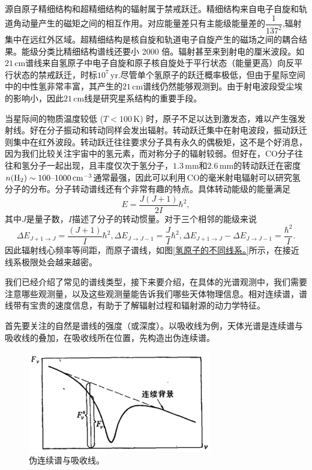 \documentclass[../天体物理基础.tex]{subfiles}
\begin{document}
源自原子精细结构和超精细结构的辐射属于禁戒跃迁。精细结构来自电子自旋和轨道角动量产生的磁矩之间的相互作用。对应能量差只有主能级能量差的$\dfrac{1}{137^{2}}$,辐射集中在远红外区域。超精细结构是核自旋和轨道电子自旋产生的磁场之间的耦合结果。能级分类比精细结构谱线还要小 2000 倍。辐射甚至来到射电的厘米波段。如$21\,\mathrm{cm}$谱线来自氢原子中电子自旋和原子核自旋处于平行状态（能量更高）向反平行状态的禁戒跃迁，时标$10^{7}\,\mathrm{yr}$.尽管单个氢原子的跃迁概率极低，但由于星际空间中的中性氢非常丰富，其产生的$21\,\mathrm{cm}$谱线仍然能够观测到。由于射电波段受尘埃的影响小，因此$21\,\mathrm{cm}$线是研究星系结构的重要手段。

当星际间的物质温度较低 ($T<100\,\mathrm{K}$) 时，原子不足以达到激发态，难以产生强发射线。好在分子振动和转动同样会发出辐射。转动跃迁集中在射电波段，振动跃迁则集中在红外波段。转动跃迁往往要求分子具有永久的偶极矩，这不是个好消息，因为我们比较关注宇宙中的氢元素，而对称分子的辐射较弱。但好在，$\mathrm{CO}$分子往往和氢分子一起出现，且丰度仅次于氢分子，$1.3\,\mathrm{mm}$和$2.6\,\mathrm{mm}$的转动跃迁在密度$n(\mathrm{H}_{2})\sim100\text{\textendash}1000\,\mathrm{cm^{-3}}$通常最强，因此可以利用$\,\mathrm{CO}$的毫米射电辐射可以研究氢分子的分布。分子转动谱线还有个非常有趣的特点。具体转动能级的能量满足
\begin{equation}
E=\frac{J(J+1)}{2I}\hbar^{2},
\end{equation}
其中$J$是量子数，$I$描述了分子的转动惯量。对于三个相邻的能级来说
\begin{equation}
\Delta{}E_{J+1\to J}=\frac{\left(J+1\right)}{I}\hbar^{2},\Delta{}E_{J\to J-1}=\frac{J}{I}\hbar^{2},\Delta{}E_{J+1\to J}-\Delta{}E_{J\to J-1}=\frac{\hbar^{2}}{I}.
\end{equation}
因此辐射线心频率等间距，而原子谱线，如图\ref{氢原子的不同线系。}所示，在接近线系极限处会越来越密。

我们已经介绍了常见的谱线类型，接下来要介绍，在具体的光谱观测中，我们需要注意哪些观测量，以及这些观测量能告诉我们哪些天体物理信息。相对连续谱，谱线带有宝贵的速度信息，有助于了解辐射过程和辐射源的动力学特征。

首先要关注的自然是谱线的强度（或深度）。以吸收线为例，天体光谱是连续谱与吸收线的叠加，在吸收线所在位置，先构造出伪连续谱。
\begin{figure}[!htbp]
\centering
\includegraphics[width=8cm]{figures/figure1_13.png}
\captionsetup{justification=raggedright, singlelinecheck=false}
\caption{伪连续谱与吸收线。}
\label{伪连续谱与吸收线。}
\end{figure}
\end{document}
